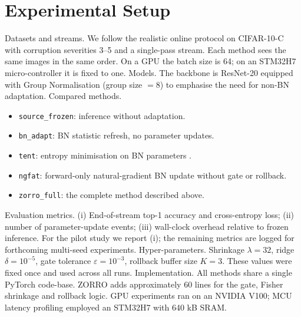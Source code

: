 \documentclass{article} %
\begin{document}
\section{Experimental Setup}
\label{sec:experimental}
Datasets and streams. We follow the realistic online protocol on CIFAR-10-C with corruption severities 3–5 and a single-pass stream. Each method sees the same images in the same order. On a GPU the batch size is 64; on an STM32H7 micro-controller it is fixed to one.
Models. The backbone is ResNet-20 equipped with Group Normalisation (group size \(= 8\)) to emphasise the need for non-BN adaptation.
Compared methods.
\begin{itemize}
\item \texttt{source\_frozen}: inference without adaptation.
\item \texttt{bn\_adapt}: BN statistic refresh, no parameter updates.
\item \texttt{tent}: entropy minimisation on BN parameters \cite{wang-2020-tent}.
\item \texttt{ngfat}: forward-only natural-gradient BN update without gate or rollback.
\item \texttt{zorro\_full}: the complete method described above.
\end{itemize}
Evaluation metrics. (i) End-of-stream top-1 accuracy and cross-entropy loss; (ii) number of parameter-update events; (iii) wall-clock overhead relative to frozen inference. For the pilot study we report (i); the remaining metrics are logged for forthcoming multi-seed experiments.
Hyper-parameters. Shrinkage \(\lambda = 32\), ridge \(\delta = 10^{-5}\), gate tolerance \(\varepsilon = 10^{-3}\), rollback buffer size \(K = 3\). These values were fixed once and used across all runs.
Implementation. All methods share a single PyTorch code-base. ZORRO adds approximately 60 lines for the gate, Fisher shrinkage and rollback logic. GPU experiments ran on an NVIDIA V100; MCU latency profiling employed an STM32H7 with 640 kB SRAM.
\end{document}
